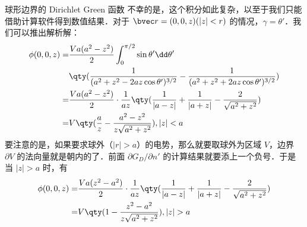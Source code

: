 \begin{example}{球形边界的 Dirichlet Green 函数}
不幸的是，这个积分如此复杂，以至于我们只能借助计算软件得到数值结果．对于 $\bvec r=(0,0,z)(|z|<r)$ 的情况，$\gamma=\theta'$．我们可以推出解析解：
\begin{equation}
\begin{aligned}
\phi(0,0,z)=&\frac{Va(a^2-z^2)}{2}\int_0^{\pi/2}\sin\theta'\dd \theta'\\
&\qty(\frac{1}{(a^2+z^2-2az\cos\theta')^{3/2}}-\frac{1}{(a^2+z^2+2az\cos\theta')^{3/2}})\\
=&\frac{Va(a^2-z^2)}{2}\cdot \frac{1}{az}\qty(\frac{1}{|a-z|}+\frac{1}{|a+z|}-\frac{2}{\sqrt{a^2+z^2}})\\
=&V\qty(\frac{a}{z}-\frac{a^2-z^2}{z\sqrt{a^2+z^2}}),    |z|<a
\end{aligned}
\end{equation}
要注意的是，如果要求球外（$|r|>a$）的电势，那么就要取球外为区域 $V$，边界 $\partial V$ 的法向量就是朝内的了．前面 $\partial G_D/\partial n'$ 的计算结果就要添上一个负号．于是当 $|z|>a$ 时，有 
\begin{equation}
\begin{aligned}
\phi(0,0,z)=&\frac{Va(z^2-a^2)}{2}\cdot \frac{1}{az}\qty(\frac{1}{|a-z|}+\frac{1}{|a+z|}-\frac{2}{\sqrt{a^2+z^2}})\\
=&V\qty(1-\frac{z^2-a^2}{z\sqrt{a^2+z^2}}),    |z|>a
\end{aligned}
\end{equation}
\end{example}

